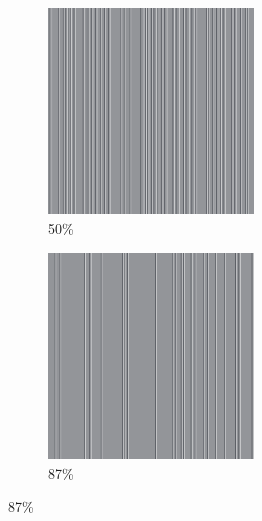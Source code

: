 \documentclass[12pt, fleqn]{report}                             %
\theoremstyle{break}                                            %
\begin{document}
\begin{figure}[ht!]
\begin{subfigure}[b]{0.4\linewidth}
          \includegraphics[width=0.6\textwidth]{Images/29/c.png}
          \caption{50\%}
        \end{subfigure}
        \begin{subfigure}[b]{0.4\linewidth}
          \includegraphics[width=0.6\textwidth]{Images/29/d.png}
          \caption{87\%}
        \end{subfigure}
      \end{figure}
\end{document}
